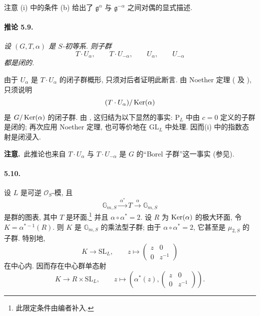 注意 \textup{(i)} 中的条件 \textup{(b)} 给出了 \(\mathfrak g^\alpha\) 与 \(\mathfrak g^{-\alpha}\) 之间对偶的显式描述.

\paragraph{\textbf{推论 5.9.}}
\emph{设 \((G,T,\alpha)\) 是 \(S\)-初等系. 则子群}
\[
 T\cdot U_\alpha,\qquad T\cdot U_{-\alpha},
 \qquad U_\alpha,\qquad U_{-\alpha}
\]
\emph{都是闭的.}

由于 \(U_\alpha\) 是 \(T\cdot U_\alpha\) 的闭子群概形, 只须对后者证明此断言. 由 Noether 定理 \textup{( 及 )}, 只须说明
\[
 (T\cdot U_\alpha)/\operatorname{Ker}(\alpha)
\]
是 \(G/\operatorname{Ker}(\alpha)\) 的闭子群. 由 , 这归结为以下显然的事实: \(\mathrm P_L\) 中由 \(c=0\) 定义的子群是闭的; 再次应用 Noether 定理, 也可等价地在 \(\mathrm{GL}_L\) 中处理. 因而\textup{(i)} 中的指数态射是闭浸入.

\smallskip
\noindent\textbf{注意.}\ 此推论也来自 \(T\cdot U_\alpha\) 与 \(T\cdot U_{-\alpha}\) 是 \(G\) 的“Borel 子群”这一事实 \textup{(参见)}.

\paragraph{\textbf{5.10.}}
设 \(L\) 是可逆 \(\mathcal O_S\)-模, 且
\[
 \mathbb G_{m,S}\xrightarrow{\ \alpha^\ast\ }T
 \xrightarrow{\ \alpha\ }\mathbb G_{m,S}
\]
是群的图表, 其中 \(T\) 是环面,\footnote{此限定条件由编者补入.} 并且 \(\alpha\circ\alpha^\ast=2\). 设 \(R\) 为 \(\operatorname{Ker}(\alpha)\) 的极大环面, 令 \(K=\alpha^{\ast-1}(R)\). 则 \(K\) 是 \(\mathbb G_{m,S}\) 的乘法型子群; 由于 \(\alpha\circ\alpha^\ast=2\), 它甚至是 \(\mu_{2,S}\) 的子群. 特别地,
\[
 K\longrightarrow\mathrm{SL}_L,
 \qquad
 z\longmapsto\begin{pmatrix}z&0\\0&z^{-1}\end{pmatrix}
\]
在中心内. 因而存在中心群单态射
\[
 K\longrightarrow R\times\mathrm{SL}_L,
 \qquad
 z\longmapsto
 \left(
 \alpha^\ast(z),
 \begin{pmatrix}z&0\\0&z^{-1}\end{pmatrix}
 \right).
\]

